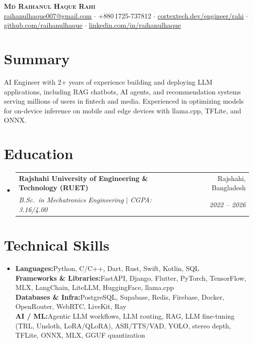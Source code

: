 \documentclass[a4paper,11.5pt]{extarticle}
\makeatletter
\newcommand{\resumeSubheading}[4]{
  \vspace{2pt}\item
    \begin{tabular*}{0.97\textwidth}[t]{l@{\extracolsep{\fill}}r}
      \textbf{#1} & \small#2 \\
      \textit{#3} & \textit{\small#4} \\
    \end{tabular*}\vspace{-4pt}
}
\newcommand{\resumeSubHeadingListStart}{\begin{itemize}[leftmargin=0.15in, label={}, topsep=2pt]}
\newcommand{\resumeSubHeadingListEnd}{\end{itemize}\vspace{2pt}}
\makeatother
\begin{document}
\begin{center}
  {\Huge\bfseries\scshape Md Raihanul Haque Rahi}\\[6pt]
  \small
  \href{mailto:raihanulhaque007@gmail.com}{raihanulhaque007@gmail.com}
  \enspace$\cdot$\enspace
  {+880\,1725-737812}
  \enspace$\cdot$\enspace
  \href{https://cortextech.dev/engineer/rahi/}{cortextech.dev/engineer/rahi}
  \enspace$\cdot$\enspace
  \href{https://github.com/raihanulhaque}{github.com/raihanulhaque}
  \enspace$\cdot$\enspace
  \href{https://linkedin.com/in/raihanulhaque}{linkedin.com/in/raihanulhaque}
\end{center}

\vspace{2pt}

\section{Summary}
\normalsize{
  AI Engineer with 2+ years of experience building and deploying LLM applications, including RAG chatbots,
  AI agents, and recommendation systems serving millions of users in fintech and media. Experienced in
  optimizing models for on-device inference on mobile and edge devices with llama.cpp, TFLite, and ONNX.
}

\vspace{2pt}

\section{Education}
\resumeSubHeadingListStart
  \resumeSubheading
    {Rajshahi University of Engineering \& Technology (RUET)}{Rajshahi, Bangladesh}
    {B.Sc.\ in Mechatronics Engineering $|$ CGPA: 3.16/4.00}{2022 -- 2026}
\resumeSubHeadingListEnd

\section{Technical Skills}
\begin{itemize}[leftmargin=0.15in, label={}, itemsep=3pt, topsep=2pt]
  \normalsize\item{
    \textbf{Languages:}\quad Python, C/C++, Dart, Rust, Swift, Kotlin, SQL \\
    \textbf{Frameworks \& Libraries:}\quad FastAPI, Django, Flutter, PyTorch, TensorFlow, MLX, LangChain, LiteLLM, HuggingFace, llama.cpp \\
    \textbf{Databases \& Infra:}\quad PostgreSQL, Supabase, Redis, Firebase, Docker, OpenRouter, WebRTC, LiveKit, Ray \\
    \textbf{AI / ML:}\quad Agentic LLM workflows, LLM routing, RAG, LLM fine-tuning (TRL, Unsloth, LoRA/QLoRA), ASR/TTS/VAD, YOLO, stereo depth, TFLite, ONNX, MLX, GGUF quantization
  }
\end{itemize}
\end{document}
